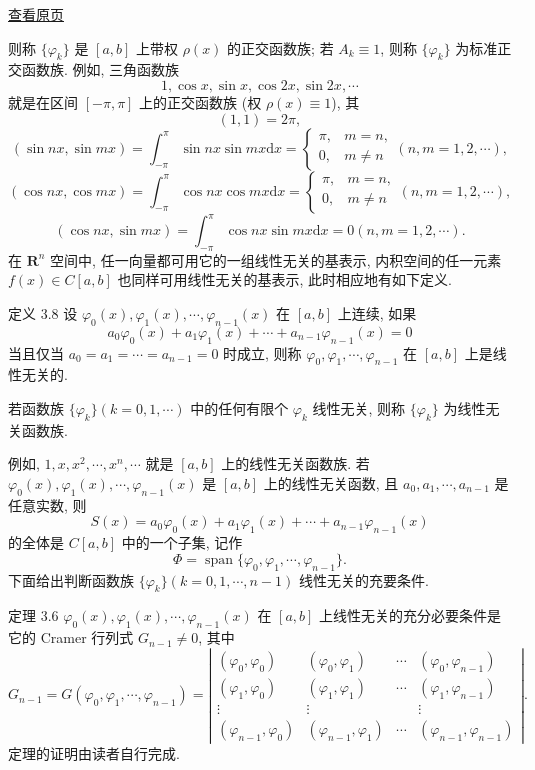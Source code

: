 \documentclass[
  10pt,
  fontset=fandol]{ctexart}
\begin{document}
\href{../../source-images/pdf-067.jpeg}{查看原页}

则称 \(\{\varphi_k\}\) 是 \([a,b]\) 上带权 \(\rho(x)\) 的正交函数族; 若 \(A_k \equiv 1\), 则称 \(\{\varphi_k\}\) 为标准正交函数族. 例如, 三角函数族 \[
1, \cos x, \sin x, \cos 2x, \sin 2x, \cdots
\] 就是在区间 \([-\pi, \pi]\) 上的正交函数族 (权 \(\rho(x) \equiv 1\)), 其 \[
(1,1) = 2\pi,
\] \[
(\sin nx, \sin mx) = \int_{-\pi}^{\pi} \sin nx \sin mx \mathrm{d}x = \begin{cases} \pi, & m=n, \\ 0, & m \neq n \end{cases} (n,m=1,2, \cdots),
\] \[
(\cos nx, \cos mx) = \int_{-\pi}^{\pi} \cos nx \cos mx \mathrm{d}x = \begin{cases} \pi, & m=n, \\ 0, & m \neq n \end{cases} (n,m=1,2, \cdots),
\] \[
(\cos nx, \sin mx) = \int_{-\pi}^{\pi} \cos nx \sin mx \mathrm{d}x = 0 (n,m=1,2, \cdots).
\] 在 \(\mathbf{R}^n\) 空间中, 任一向量都可用它的一组线性无关的基表示, 内积空间的任一元素 \(f(x) \in C[a,b]\) 也同样可用线性无关的基表示, 此时相应地有如下定义.

定义 3.8 设 \(\varphi_0(x), \varphi_1(x), \cdots, \varphi_{n-1}(x)\) 在 \([a,b]\) 上连续, 如果 \[
a_0 \varphi_0(x) + a_1 \varphi_1(x) + \cdots + a_{n-1} \varphi_{n-1}(x) = 0
\] 当且仅当 \(a_0 = a_1 = \cdots = a_{n-1} = 0\) 时成立, 则称 \(\varphi_0, \varphi_1, \cdots, \varphi_{n-1}\) 在 \([a,b]\) 上是线性无关的.

若函数族 \(\{\varphi_k\} (k=0,1, \cdots)\) 中的任何有限个 \(\varphi_k\) 线性无关, 则称 \(\{\varphi_k\}\) 为线性无关函数族.

例如, \(1,\allowbreak  x,\allowbreak  x^2,\allowbreak  \cdots,\allowbreak  x^n,\allowbreak  \cdots\) 就是 \([a,b]\) 上的线性无关函数族. 若 \(\varphi_0(x), \varphi_1(x), \cdots, \varphi_{n-1}(x)\) 是 \([a,b]\) 上的线性无关函数, 且 \(a_0, a_1, \cdots, a_{n-1}\) 是任意实数, 则 \[
S(x) = a_0 \varphi_0(x) + a_1 \varphi_1(x) + \cdots + a_{n-1} \varphi_{n-1}(x)
\] 的全体是 \(C[a,b]\) 中的一个子集, 记作 \[
\Phi = \operatorname{span}\{\varphi_0, \varphi_1, \cdots, \varphi_{n-1}\}. \tag{3.3.9}
\] 下面给出判断函数族 \(\{\varphi_k\} (k=0,1, \cdots, n-1)\) 线性无关的充要条件.

定理 3.6 \(\varphi_0(x), \varphi_1(x), \cdots, \varphi_{n-1}(x)\) 在 \([a,b]\) 上线性无关的充分必要条件是它的 Cramer 行列式 \(G_{n-1} \neq 0\), 其中 \[
G_{n-1} = G(\varphi_0, \varphi_1, \cdots, \varphi_{n-1}) = \left| \begin{array}{cccc} (\varphi_0, \varphi_0) & (\varphi_0, \varphi_1) & \cdots & (\varphi_0, \varphi_{n-1}) \\ (\varphi_1, \varphi_0) & (\varphi_1, \varphi_1) & \cdots & (\varphi_1, \varphi_{n-1}) \\ \vdots & \vdots & & \vdots \\ (\varphi_{n-1}, \varphi_0) & (\varphi_{n-1}, \varphi_1) & \cdots & (\varphi_{n-1}, \varphi_{n-1}) \end{array} \right|. \tag{3.3.10}
\] 定理的证明由读者自行完成.
\end{document}
